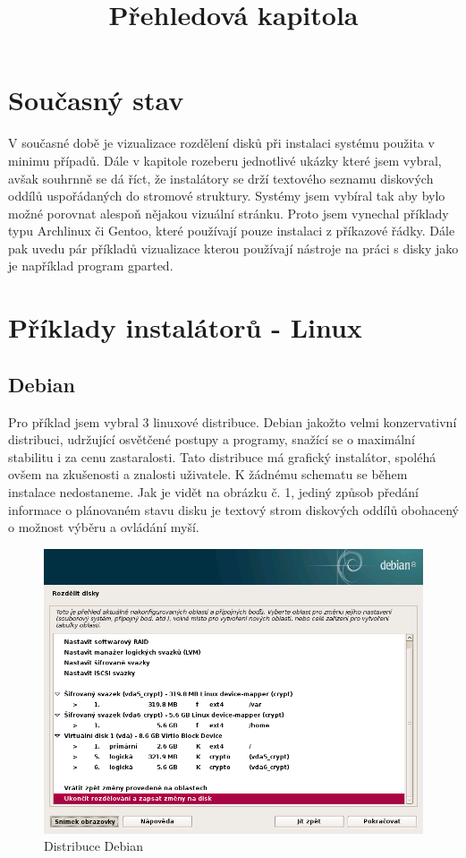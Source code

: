 \documentclass[a4paper]{article}
\begin{document}
\title{Přehledová kapitola}
\maketitle
\section{Současný stav}

V současné době je vizualizace rozdělení disků při instalaci systému použita v minimu případů. Dále v kapitole rozeberu jednotlivé ukázky které jsem vybral, avšak souhrnně se dá říct, 
že instalátory se drží textového seznamu diskových oddílů uspořádaných do stromové struktury. Systémy jsem vybíral tak aby bylo možné porovnat alespoň nějakou vizuální stránku. Proto jsem vynechal
příklady typu Archlinux či Gentoo, které používají pouze instalaci z  příkazové řádky.  Dále pak uvedu pár příkladů vizualizace kterou používají nástroje na práci s disky jako je 
například program gparted.

\section{Příklady instalátorů - Linux}

\subsection{Debian}

Pro příklad jsem vybral 3 linuxové distribuce. Debian jakožto velmi konzervativní distribuci, udržující osvětčené postupy a programy, snažící se o maximální stabilitu i za cenu zastaralosti. 
Tato distribuce má grafický instalátor, spoléhá ovšem na zkušenosti a znalosti uživatele. K žádnému schematu se během instalace nedostaneme. Jak je vidět na obrázku č. 1, jediný způsob předání 
informace o plánovaném stavu disku je textový strom diskových oddílů obohacený o možnost výběru a ovládání myší.

\begin{figure}
\caption{Distribuce Debian}
\centering
\includegraphics[width=.8\columnwidth]{pics/debian1.png}
\end{figure}
\end{document}
